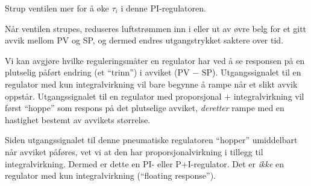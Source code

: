 
Strup ventilen mer for å øke $\tau_i$ i denne PI-regulatoren.







Når ventilen strupes, reduseres luftstrømmen inn i eller ut av øvre belg for et gitt avvik mellom PV og SP, og dermed endres utgangstrykket saktere over tid.

\vskip 10pt

Vi kan avgjøre hvilke reguleringsmåter en regulator har ved å se responsen på en plutselig påført endring (et ``trinn'') i avviket (PV $-$ SP). Utgangssignalet til en regulator med kun integralvirkning vil bare begynne å rampe når et slikt avvik oppstår. Utgangssignalet til en regulator med proporsjonal + integralvirkning vil først ``hoppe'' som respons på det plutselige avviket, {\it deretter} rampe med en hastighet bestemt av avvikets størrelse.

Siden utgangssignalet til denne pneumatiske regulatoren ``hopper'' umiddelbart når avviket påføres, vet vi at den har proporsjonalvirkning i tillegg til integralvirkning. Dermed er dette en PI- eller P+I-regulator. Det er {\it ikke} en regulator med kun integralvirkning (``floating response'').


